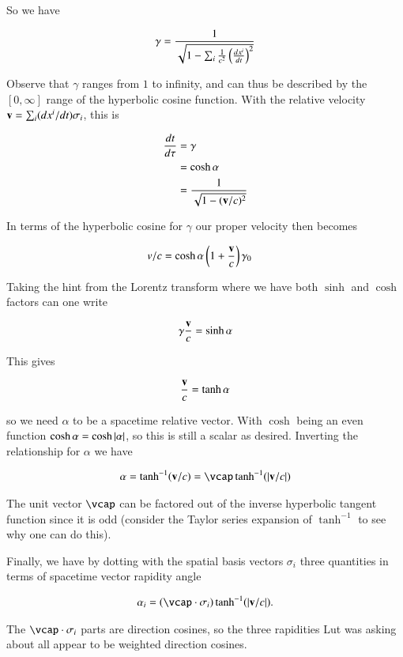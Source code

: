 \documentclass{article}
\begin{document}
So we have 

\begin{align*}
\gamma 
&= \frac{1}{\sqrt{1 - \sum_i \frac{1}{c^2} \left(\frac{dx^i}{dt}\right)^2 }} \\
\end{align*}

Observe that $\gamma$ ranges from $1$ to infinity, and can thus be described by the $[0,\infty]$ range of the hyperbolic cosine function.  With
the relative velocity $\mathbf{v} = \sum_i (dx^i/dt) \sigma_i$, this is

\begin{align*}
\frac{dt}{d\tau} &= \gamma  \\
&= \cosh\alpha \\
&= \frac{1}{\sqrt{1 - (\mathbf{v}/c)^2}}
\end{align*}

In terms of the hyperbolic cosine for $\gamma$ our proper velocity then becomes

\begin{align*}
v/c &= \cosh\alpha \left(1 + \frac{\mathbf{v}}{c} \right) \gamma_0
\end{align*}

Taking the hint from the Lorentz transform where we have both $\sinh$ and $\cosh$ factors can one write

\begin{align*}
\gamma \frac{\mathbf{v}}{c} = \sinh\alpha
\end{align*}

This gives

\begin{align*}
\frac{\mathbf{v}}{c} = \tanh\alpha
\end{align*}

so we need $\alpha$ to be a spacetime relative vector.  With $\cosh$ being an even function $\cosh{\alpha} = \cosh{\left\lvert{\alpha}\right\rvert}$, so this
is still a 
scalar as desired.  Inverting the relationship for $\alpha$ we have

\begin{align*}
\alpha = \tanh^{-1} (\Bv/c) = \vcap \tanh^{-1} (\Abs{\Bv/c})
\end{align*}

The unit vector $\vcap$ can be factored out of the inverse hyperbolic tangent function since it is odd (consider the Taylor series expansion of $\tanh^{-1}$ to see why one can do this).

Finally, we have by 
dotting with the spatial basis vectors $\sigma_i$ three quantities in terms of spacetime vector rapidity angle

\begin{align*}
\alpha_i = (\vcap \cdot \sigma_i) \tanh^{-1} (\Abs{\Bv/c}).
\end{align*}

The $\vcap \cdot \sigma_i$ parts are direction cosines, so the three rapidities Lut was asking about all appear to be weighted direction cosines.



\end{document}
